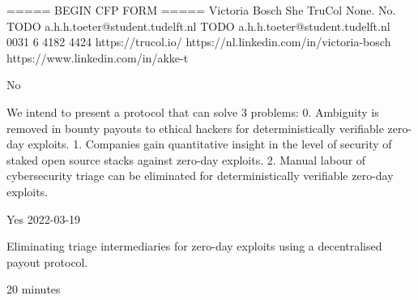 \documentclass{article}
\begin{document}
===== BEGIN CFP FORM =====
Victoria Bosch
She
TruCol
None.
No.
TODO
a.h.h.toeter@student.tudelft.nl
TODO
a.h.h.toeter@student.tudelft.nl
0031 6 4182 4424
https://trucol.io/
https://nl.linkedin.com/in/victoria-bosch
https://www.linkedin.com/in/akke-t

No

We intend to present a protocol that can solve 3 problems:
0. Ambiguity is removed in bounty payouts to ethical hackers for deterministically verifiable zero-day exploits.
1. Companies gain quantitative insight in the level of security of staked open source stacks against zero-day exploits.
2. Manual labour of cybersecurity triage can be eliminated for deterministically verifiable zero-day exploits.

Yes
2022-03-19

Eliminating triage intermediaries for zero-day exploits using a decentralised payout protocol.

20 minutes
\end{document}
